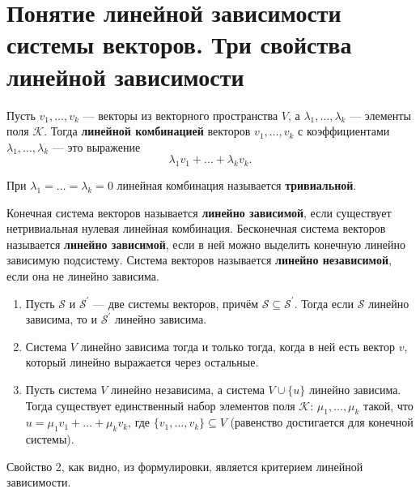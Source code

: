 \section{Понятие линейной зависимости системы векторов. Три свойства линейной зависимости}

\begin{definition}
    Пусть $v_1, \ldots, v_k$ --- векторы из векторного пространства $V$, а $\lambda_1, \ldots, \lambda_k$ --- элементы поля $\mathcal{K}$. Тогда \textbf{линейной комбинацией} векторов $v_1, \ldots, v_k$ с коэффициентами $\lambda_1, \ldots, \lambda_k$ --- это выражение
    $$
    \lambda_1v_1 + \ldots + \lambda_kv_k.
    $$

    При $\lambda_1 = \ldots = \lambda_k = 0$ линейная комбинация называется \textbf{тривиальной}.
\end{definition}

\begin{definition}
    Конечная система векторов называется \textbf{линейно зависимой}, если существует нетривиальная нулевая линейная комбинация. Бесконечная система векторов называется \textbf{линейно зависимой}, если в ней можно выделить конечную линейно зависимую подсистему. Система векторов называется \textbf{линейно независимой}, если она не линейно зависима.
\end{definition}

\begin{theorem}
    \begin{enumerate}[nolistsep]
        \item Пусть $\mathcal{S}$ и $\mathcal{S}^\prime$ --- две системы векторов, причём $\mathcal{S} \subseteq \mathcal{S}^\prime$. Тогда если $\mathcal{S}$ линейно зависима, то и $\mathcal{S}^\prime$ линейно зависима.
        \item Система $V$ линейно зависима тогда и только тогда, когда в ней есть вектор $v$, который линейно выражается через остальные.
        \item Пусть система $V$ линейно независима, а система $V \cup \{u\}$ линейно зависима. Тогда существует единственный набор элементов поля $\mathcal{K}$: $\mu_1, \ldots, \mu_k$ такой, что $u = \mu_1v_1 + \ldots + \mu_kv_k$, где $\{v_1, \ldots, v_k\} \subseteq V$ (равенство достигается для конечной системы).
    \end{enumerate}
\end{theorem}

\begin{remark}
    Свойство 2, как видно, из формулировки, является критерием линейной зависимости.
\end{remark}

